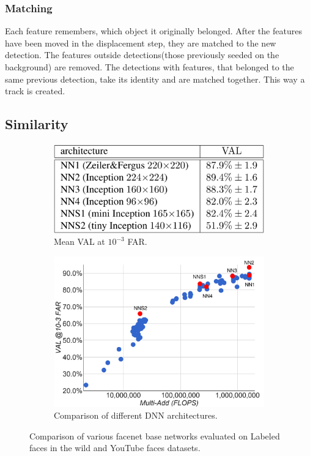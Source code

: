 \documentclass[a4paper,12pt,titlepage, twoside]{article}
\numberwithin{figure}{section}
\begin{document}
\subsubsection{Matching}
Each feature remembers, which object it originally belonged. After the features have been moved in the displacement step, they are matched to the new detection. The features outside detections(those previously seeded on the background) are removed. The detections with features, that belonged to the same previous detection, take its identity and are matched together. This way a track is created.

\subsection{Similarity}
\label{sec:similarity}

\begin{figure}
    \begin{subfigure}[Sample1]{0.5\linewidth}
    	\includegraphics[width=0.95\linewidth]{fig/facenet_eval_table.png} 
        \caption{Mean VAL at $10^{-3}$ FAR.}
        \label{fig:facenet_table}
    \end{subfigure}
    \quad
    \begin{subfigure}[Sample1]{0.5\linewidth} 
    	\includegraphics[width=0.95\linewidth]{fig/facenet_eval.png}
        \caption{Comparison of different DNN architectures.}   
        \label{fig:triplet_loss}
    \end{subfigure}
    \caption{Comparison of various facenet\cite{szegedy2016rethinking} base networks evaluated on Labeled faces in the wild\cite{huang2007labeled} and YouTube faces\cite{wolf2011face} datasets.}
    \label{fig:facenet}
\end{figure}
\end{document}
